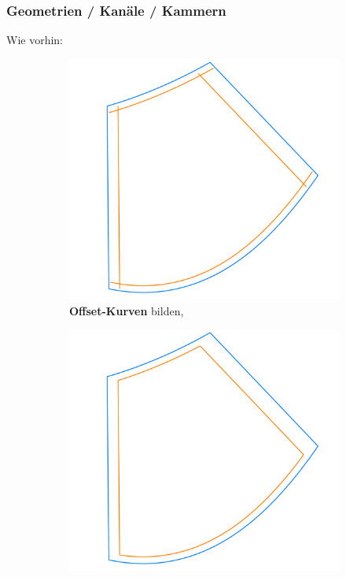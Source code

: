 \documentclass[8pt, aspectratio=169]{beamer}
\begin{document}
\begin{frame}
	\frametitle{Geometrien / Kanäle / Kammern}
	\vspace{-0.25cm}\hspace{-0.5cm}
	\centering
	\begin{minipage}[t]{\textwidth}
		Wie vorhin:
		\begin{figure}[H]
			\begin{subfigure}{.32\textwidth}
				\includegraphics[width=\textwidth]{../../tec/chambers/81.png}
				\caption{\textbf{Offset-Kurven} bilden,}
			\end{subfigure}
			\begin{subfigure}{.32\textwidth}
				\includegraphics[width=\textwidth]{../../tec/chambers/82.png}

\end{subfigure}
\end{figure}
\end{minipage}
\end{frame}
\end{document}
